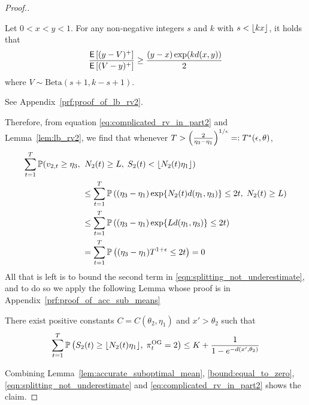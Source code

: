 \begin{proof}[Proof.]
\begin{lemma}
		Let $0 < x < y < 1$. For any non-negative integers $s$ and $k$ with $s < \lfloor kx\rfloor$, it holds that
		\begin{equation*}
		\frac{\mathsf{E} \left[ (y-V)^+  \right]}{  \mathsf{E} \left[ (V - y)^+  \right] } \ge \frac{(y-x) \exp(k d(x,y))}{2}
		\end{equation*}
		where $V \sim \text{Beta}(s+1,k-s+1)$.
	\end{lemma}
	\begin{myproof}[Proof.]
		See Appendix~\ref{prf:proof_of_lb_rv2}.
	\end{myproof}
	Therefore, from equation \eqref{eq:complicated_rv_in_part2} and Lemma~\ref{lem:lb_rv2}, we find that whenever $T > \left(\frac{2}{\eta_3-\eta_1}\right)^{1/\epsilon} =: T^*(\epsilon, \theta)$,
	\begin{align}
	\sum_{t=1}^T \mathbb{P}(v_{2,t} \ge \eta_3 ,\; & \; N_2(t) \ge L,\; S_2(t) < \lfloor N_2(t) \eta_1\rfloor) \nonumber \\
	& \le  \sum_{t=1}^T\mathbb{P} \left(   (\eta_3-\eta_1) \exp\{N_2(t) d(\eta_1,\eta_3) \} \le 2t,\; N_2(t) \ge L \right) \nonumber \\
	& \le  \sum_{t=1}^T\mathbb{P} \left(   (\eta_3-\eta_1) \exp\{L d(\eta_1,\eta_3) \} \le 2t \right) \nonumber \\
	& =   \sum_{t=1}^T\mathbb{P} \left(   (\eta_3-\eta_1) T^{1+\epsilon} \le 2t \right) = 0 \label{bound:equal_to_zero}
	\end{align}
	All that is left is to bound the second term in \eqref{eqn:splitting_not_underestimate}, and to do so we apply the following Lemma whose proof is in Appendix~\ref{prf:proof_of_acc_sub_means}
	\begin{lemma} \label{lem:accurate_suboptimal_mean}
		There exist positive constants $C = C(\theta_2,\eta_1)$ and $x' > \theta_2$ such that
		\begin{equation*}
		\sum_{t=1}^T \mathbb{P} \left( S_2(t) \ge \lfloor N_2(t) \eta_1\rfloor, \; \pi^{\rm OG}_t = 2 \right) \le  K + \frac{1}{1 - e^{-d(x',\theta_2)}} 
		\end{equation*}
	\end{lemma}
	Combining Lemma~\ref{lem:accurate_suboptimal_mean}, \eqref{bound:equal_to_zero}, \eqref{eqn:splitting_not_underestimate} and \eqref{eq:complicated_rv_in_part2} shows the claim.
\end{proof}

